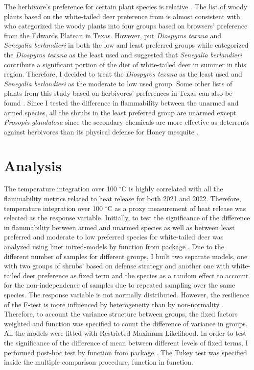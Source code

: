 \documentclass[12pt]{report}
\begin{document}
The herbivore’s preference for certain plant species is relative \citep{wright2003white}. The list of woody plants based on the white-tailed deer preference from \citep{wright2003white} is almost consistent with \citep{nelle1996management} who categorized the woody plants into four groups based on browsers’ preference from the Edwards Plateau in Texas. However,  \citep{wright2003white} put \emph{Diospyros texana} and \emph{Senegalia berlandieri} in both the low and least preferred groups while \citep{nelle1996management} categorized the \emph{Diospyros texana} as the least used and \citep*{varner1987southern} suggested that \emph{Senegalia berlandieri} contribute a significant portion of the diet of white-tailed deer in summer in this region.  Therefore, I decided to treat the \emph{Diospyros texana} as the least used and \emph{Senegalia berlandieri} as the moderate to low used group. Some other lists of plants from this study based on herbivores’ preferences in Texas can also be found \citep{arnold1979seasonallist, nelle2001ecological, everitt1974springfoodhabit, dillard2006whitetaileddeer}. Since I tested the difference in flammability between the unarmed and armed species, all the shrubs in the least preferred group are unarmed except \emph{Prosopis glandulosa} since the secondary chemicals are more effective as deterrents against herbivores than its physical defense for Honey mesquite \citep{wright2003white}.

\section{Analysis}
The temperature integration over 100 $^{\circ}$C is highly correlated with all the flammability metrics related to heat release for both 2021 and 2022. Therefore, temperature integration over 100 $^{\circ}$C as a proxy measurement of heat release was selected as the response variable. Initially, to test the significance of the difference in flammability between armed and unarmed species as well as between least preferred and moderate to low preferred species for white-tailed deer was analyzed using liner mixed-models by  function from  package \citep{pinheiro2017package}. Due to the different number of samples for different groups, I  built two separate models, one with two groups of shrubs' based on defense strategy and another one with white-tailed deer preference as fixed term and the species as a random effect to account for the non-independence of samples due to repeated sampling over the same species. The response variable is not normally distributed. However, the resilience of the F-test is more influenced by heterogeneity than by non-normality \citep{blanca2017non}. Therefore, to account the variance structure between groups, the fixed factors weighted and  function was specified to count the difference of variance in groups. All the models were fitted with Restricted Maximum Likelihood. In order to test the significance of the difference of mean between different levels of fixed terms, I performed post-hoc test by  function from  package \citep{hothorn2016package}. The Tukey test was specified inside the multiple comparison procedure,  function in  function.
\end{document}
